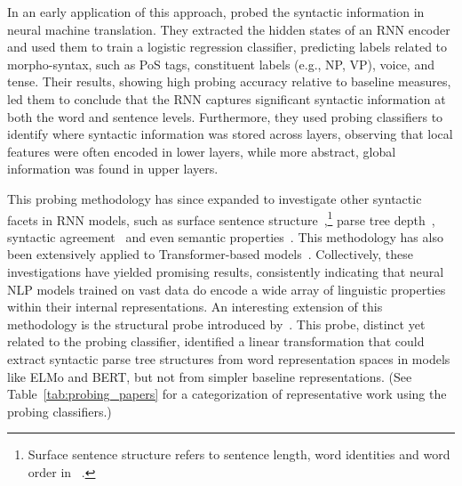 In an early application of this approach, \cite{shi-etal-2016-string} probed the syntactic information in neural machine translation. They extracted the hidden states of an RNN encoder and used them to train a logistic regression classifier, predicting labels related to morpho-syntax, such as PoS tags, constituent labels (e.g., NP, VP), voice, and tense. Their results, showing high probing accuracy relative to baseline measures, led them to conclude that the RNN captures significant syntactic information at both the word and sentence levels. Furthermore, they used probing classifiers to identify where syntactic information was stored across layers, observing that local features were often encoded in lower layers, while more abstract, global information was found in upper layers.

This probing methodology has since expanded to investigate other syntactic facets in RNN models, such as surface sentence structure~\citep{adi2016fine},\footnote{Surface sentence structure refers to sentence length, word identities and word order in ~\cite{adi2016fine}.} parse tree depth~\citep{conneau-etal-2018-cram}, syntactic agreement~\citep{giulianelli-etal-2018-hood} and even semantic properties~\citep{ettinger-etal-2016-probing}. This methodology has also been extensively applied to Transformer-based models~. Collectively, these investigations have yielded promising results, consistently indicating that neural NLP models trained on vast data do encode a wide array of linguistic properties within their internal representations. An interesting extension of this methodology is the structural probe introduced by~\cite{hewitt-manning-2019-structural}. This probe, distinct yet related to the probing classifier, identified a linear transformation that could extract syntactic parse tree structures from word representation spaces in models like ELMo and BERT, but not from simpler baseline representations. (See Table~\ref{tab:probing_papers} for a categorization of representative work using the probing classifiers.)
